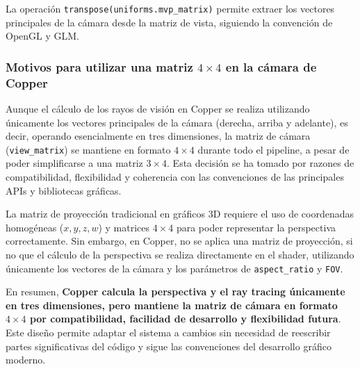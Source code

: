 La operación \texttt{transpose(uniforms.mvp\_matrix)} permite extraer los
vectores principales de la cámara desde la matriz de vista, siguiendo la
convención de OpenGL y GLM. \break

\subsubsection{Motivos para utilizar una matriz $4\times4$ en la cámara de Copper}

Aunque el cálculo de los rayos de visión en Copper se realiza utilizando
únicamente los vectores principales de la cámara (derecha, arriba y adelante),
es decir, operando esencialmente en tres dimensiones, la matriz de cámara
(\texttt{view\_matrix}) se mantiene en formato $4\times4$ durante todo el
pipeline, a pesar de poder simplificarse a una matriz $3\times4$. Esta decisión se ha tomado por razones de compatibilidad,
flexibilidad y coherencia con las convenciones de las principales APIs y
bibliotecas gráficas.

La matriz de proyección tradicional en gráficos 3D requiere el uso de coordenadas homogéneas ($x, y, z, w$) y
matrices $4\times4$ para poder representar la perspectiva correctamente\cite{Ahn2008}. Sin
embargo, en Copper, no se aplica una matriz de proyección, si no que el cálculo de la perspectiva se
realiza directamente en el shader, utilizando únicamente los vectores de la
cámara y los parámetros de \texttt{aspect\_ratio} y \texttt{FOV}.

En resumen, \textbf{Copper calcula la perspectiva y el ray tracing únicamente
    en tres dimensiones, pero mantiene la matriz de cámara en formato $4\times4$
    por compatibilidad, facilidad de desarrollo y flexibilidad futura}. Este diseño
permite adaptar el sistema a cambios sin necesidad de reescribir partes
significativas del código y sigue las convenciones del desarrollo gráfico
moderno.
